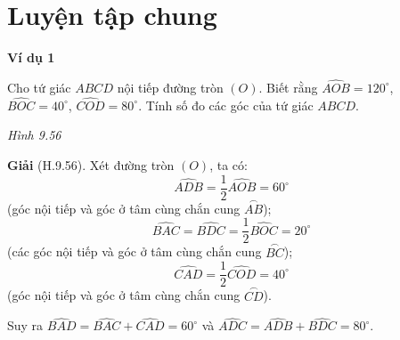 
\section*{Luyện tập chung}

\begin{exercises}
    \textbf{Ví dụ 1}

    Cho tứ giác $ABCD$ nội tiếp đường tròn $(O)$. Biết rằng $\widehat{AOB}=120^\circ$, $\widehat{BOC}=40^\circ$, $\widehat{COD}=80^\circ$. Tính số đo các góc của tứ giác $ABCD$.

    \begin{center}

        \textit{Hình 9.56}
    \end{center}

    \textbf{Giải} (H.9.56). Xét đường tròn $(O)$, ta có:
    \[
        \widehat{ADB}=\dfrac{1}{2}\widehat{AOB}=60^\circ
    \]
    (góc nội tiếp và góc ở tâm cùng chắn cung $\overset{\frown}{AB}$);
    \[
        \widehat{BAC}=\widehat{BDC}=\dfrac{1}{2}\widehat{BOC}=20^\circ
    \]
    (các góc nội tiếp và góc ở tâm cùng chắn cung $\overset{\frown}{BC}$);
    \[
        \widehat{CAD}=\dfrac{1}{2}\widehat{COD}=40^\circ
    \]
    (góc nội tiếp và góc ở tâm cùng chắn cung $\overset{\frown}{CD}$).

    Suy ra $\widehat{BAD}=\widehat{BAC}+\widehat{CAD}=60^\circ$ và $\widehat{ADC}=\widehat{ADB}+\widehat{BDC}=80^\circ$.


\end{exercises}
